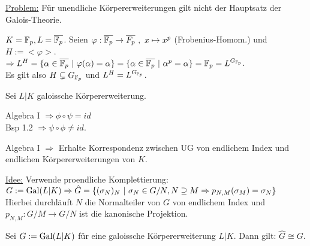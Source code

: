 \underline{Problem:} Für unendliche Körpererweiterungen gilt nicht der Hauptsatz der Galois-Theorie.

\begin{Bsp}
$K=\mathbb{F}_p, L=\overline{\mathbb{F}_p}$. Seien $\varphi : \overline{\mathbb{F}_p} \to \overline{F_p} \ , \ x \mapsto x^p $ (Frobenius-Homom.) und $H:= < \varphi >$.\\
$\Rightarrow L^H=\{\alpha \in \overline{\F_p} \ | \ \varphi(\alpha)=\alpha\} = \{ \alpha \in \overline{\F_p} \ | \ \alpha^p = \alpha \} = \F_p = L^{G_{\F_p}}$.\\
Es gilt also $H \subsetneq G_{\mathbb{F}_p}$ und $L^H=L^{G_{\mathbb{F}_p}}$.
\end{Bsp}

\begin{Err}
Sei $L|K$ galoissche Körpererweiterung.\\
\end{Err}

Algebra I $\Rightarrow \phi \circ \psi = id$\\
Bsp 1.2 $\Rightarrow \psi \circ \phi \neq id.$

\begin{Bem}
Algebra I $\Rightarrow$ Erhalte Korrespondenz zwischen UG von endlichem Index und endlichen Körpererweiterungen von $K$.
\end{Bem}

\underline{Idee:} Verwende proendliche Komplettierung:\\
$G:=\operatorname{Gal}(L|K) \Rightarrow \hat{G}= \{ (\sigma_N)_N \ | \ \sigma_N \in G/N, N \supseteq M \Rightarrow p_{N,M}(\sigma_M)=\sigma_N\}$\\
Hierbei durchläuft $N$ die Normalteiler von $G$ von endlichem Index und $p_{N,M}: G/M \to G/N$ ist die kanonische Projektion.

\begin{Prop}
Sei $G:=\operatorname{Gal}(L|K)$ für eine galoissche Körpererweiterung $L|K$. Dann gilt: $\hat{G} \cong G$.
\end{Prop}